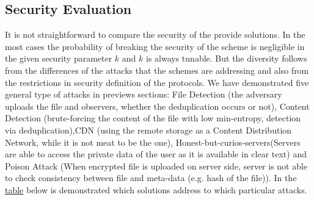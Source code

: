\documentclass[12pt]{article}
\begin{document}
\subsection{Security Evaluation}
\label{sub:SecurityEva}
It is not straightforward to compare the security of the provide solutions. In the most cases the probability of breaking the security of the scheme is negligible in the given security parameter $k$ and $k$ is always tunable. But the diversity follows from the differences of the attacks that the schemes are addressing and also from the restrictions  in security definition of the protocols. We have demonstrated five general type of attacks in previews sections: File Detection (the adversary uploads the file and observers, whether the deduplication occurs or not), Content Detection (brute-forcing  the content of the file with low min-entropy, detection via deduplication),CDN (using the remote storage as a Content Distribution
Network, while it is not meat to be the one),  Honest-but-curios-servers(Servers are able to access the private data of the user as it is available in clear text) and Poison Attack (When encrypted file is uploaded on server side, server is not able to check consistency between file and meta-data (e.g. hash of the file)). In the \hyperref[table:Attacks]{table} below is demonstrated which solutions address to which particular attacks.\\\\
\end{document}
